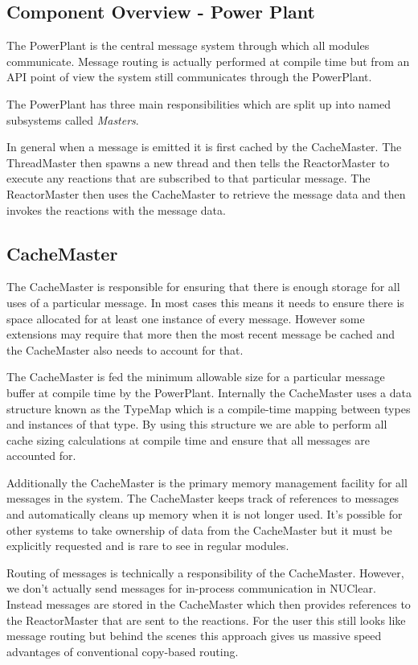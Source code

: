 \documentclass[english,12pt]{scrartcl}
\begin{document}
		\subsection{Component Overview - Power Plant}
			The PowerPlant is the central message system through which all modules communicate. 
			Message routing is actually performed at compile time but from an API point of view the system still communicates through the PowerPlant.
			
			The PowerPlant has three main responsibilities which are split up into named subsystems called \emph{Masters}.
			
			In general when a message is emitted it is first cached by the CacheMaster. 
			The ThreadMaster then spawns a new thread and then tells the ReactorMaster to execute any reactions that are subscribed to that particular message. 
			The ReactorMaster then uses the CacheMaster to retrieve the message data and then invokes the reactions with the message data.
	
			\subsection{CacheMaster}
				The CacheMaster is responsible for ensuring that there is enough storage for all uses of a particular message.
				In most cases this means it needs to ensure there is space allocated for at least one instance of every message.
				However some extensions may require that more then the most recent message be cached and the CacheMaster also needs to account for that.
				
				The CacheMaster is fed the minimum allowable size for a particular message buffer at compile time by the PowerPlant.
				Internally the CacheMaster uses a data structure known as the TypeMap which is a compile-time mapping between types and instances of that type.
				By using this structure we are able to perform all cache sizing calculations at compile time and ensure that all messages are accounted for.
				
				Additionally the CacheMaster is the primary memory management facility for all messages in the system.
				The CacheMaster keeps track of references to messages and automatically cleans up memory when it is not longer used.
				It's possible for other systems to take ownership of data from the CacheMaster but it must be explicitly requested and is rare to see in regular modules.
				
				Routing of messages is technically a responsibility of the CacheMaster.
				However, we don't actually send messages for in-process communication in NUClear. 
				Instead messages are stored in the CacheMaster which then provides references to the ReactorMaster that are sent to the reactions.
				For the user this still looks like message routing but behind the scenes this approach gives us massive speed advantages of conventional copy-based routing.
\end{document}
